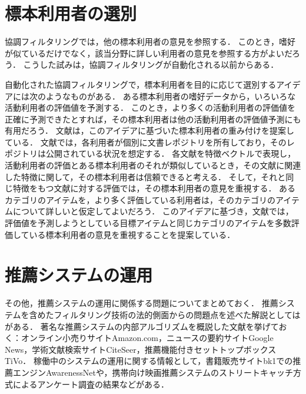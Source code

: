 \section{標本利用者の選別}
\label{sec:sampleselection}

協調フィルタリングでは，他の標本利用者の意見を参照する．
このとき，嗜好が似ているだけでなく，該当分野に詳しい利用者の意見を参照する方がよいだろう．
こうした試みは，協調フィルタリングが自動化される以前からある\cite{macm:97:04}．

自動化された協調フィルタリングで，標本利用者を目的に応じて選別するアイデアには次のようなものがある．
%
ある標本利用者の嗜好データから，いろいろな活動利用者の評価値を予測する．
このとき，より多くの活動利用者の評価値を正確に予測できたとすれば，その標本利用者は他の活動利用者の評価値予測にも有用だろう．
文献\cite{ec:027}は，このアイデアに基づいた標本利用者の重み付けを提案している．
%
文献\cite{tjsai:04:09}では，各利用者が個別に文書レポジトリを所有しており，そのレポジトリは公開されている状況を想定する．
各文献を特徴ベクトルで表現し，活動利用者の評価とある標本利用者のそれが類似しているとき，その文献に関連した特徴に関して，その標本利用者は信頼できると考える．
そして，それと同じ特徴をもつ文献に対する評価では，その標本利用者の意見を重視する．
%
あるカテゴリのアイテムを，より多く評価している利用者は，そのカテゴリのアイテムについて詳しいと仮定してよいだろう．
このアイデアに基づき，文献\cite{ieeem:07:01}では，評価値を予測しようとしている目標アイテムと同じカテゴリのアイテムを多数評価している標本利用者の意見を重視することを提案している．

\section{推薦システムの運用}
\label{sec:rsysmanagement}

その他，推薦システムの運用に関係する問題についてまとめておく．
推薦システムを含めたフィルタリング技術の法的側面からの問題点を述べた解説としては\cite{jj:020}がある．
著名な推薦システムの内部アルゴリズムを概説した文献を挙げておく：オンライン小売りサイトAmazon.com\cite{ieeem:03:01}，ニュースの要約サイトGoogle News\cite{www:07:01}，学術文献検索サイトCiteSeer\cite{ieeem:99:02}，推薦機能付きセットトップボックスTiVo\cite{kdd:04:01}．
稼働中のシステムの運用に関する情報として，書籍販売サイトbk1での推薦エンジンAwarenessNet\cite{jipsj:07:02}や，携帯向け映画推薦システムのストリートキャッチ方式によるアンケート調査\cite{trjsai:07:05}の結果などがある．

